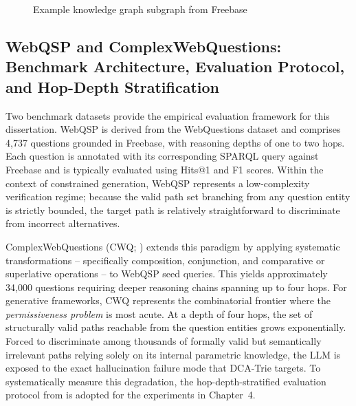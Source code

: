 \begin{figure}[H]
    \caption{Example knowledge graph subgraph from Freebase}
    \label{fig:kg_example}
\end{figure}

\subsection{WebQSP and ComplexWebQuestions: Benchmark Architecture, Evaluation Protocol, and Hop-Depth Stratification}

Two benchmark datasets provide the empirical evaluation framework for this
dissertation. WebQSP \citep{yih2016value} is derived from the WebQuestions
dataset and comprises 4,737 questions grounded in Freebase,
with reasoning depths of one to two hops. Each question is annotated
with its corresponding SPARQL query against Freebase and is typically evaluated using Hits@1 and F1 scores. Within the context of constrained generation, WebQSP
represents a low-complexity verification regime; because the valid path set branching from any question entity is strictly bounded, the target path is relatively straightforward to discriminate from incorrect alternatives.

ComplexWebQuestions (CWQ; \citealt{talmor2018web}) extends this paradigm by applying systematic transformations -- specifically composition, conjunction, and comparative or superlative operations -- to WebQSP seed queries. This yields
approximately 34,000 questions requiring deeper reasoning chains spanning up to four hops. For generative frameworks, CWQ
represents the combinatorial frontier where the \textit{permissiveness problem} is most acute. At a depth of four hops, the set of structurally valid paths reachable from the question entities
grows exponentially. Forced to discriminate among thousands of formally valid but
semantically irrelevant paths relying solely on its internal parametric knowledge, the LLM is exposed to the exact hallucination failure mode
that DCA-Trie targets. To systematically measure this degradation, the hop-depth-stratified evaluation protocol from
\citet{lan2022survey} is adopted for the experiments in Chapter~4.

